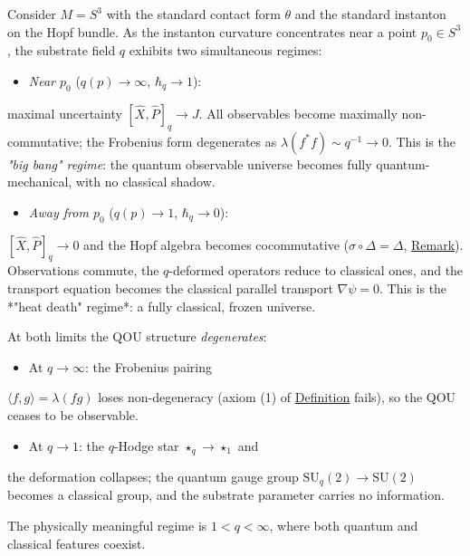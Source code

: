 \begin{example}
  \label{ex:cosmological-limits}
Consider $M = S^3$ with the standard contact form $\theta$ and the
standard instanton on the Hopf bundle.  As the instanton curvature
concentrates near a point $p_0 \in S^3$, the substrate field $q$
exhibits two simultaneous regimes:

\begin{itemize}
  \item \emph{Near $p_0$} ($q(p) \to \infty$, $\hbar_q \to 1$):
\end{itemize}
  maximal uncertainty $[\hat{X},\hat{P}]_q \to J$.
  All observables become maximally non-commutative; the
  Frobenius form degenerates as
  $\lambda(f^* f) \sim q^{-1} \to 0$.
  This is the \emph{"big bang" regime}: the quantum observable
  universe becomes fully quantum-mechanical, with no classical
  shadow.

\begin{itemize}
  \item \emph{Away from $p_0$} ($q(p) \to 1$, $\hbar_q \to 0$):
\end{itemize}
  $[\hat{X}, \hat{P}]_q \to 0$ and the Hopf algebra becomes
  cocommutative ($\sigma \circ \Delta = \Delta$,
  \hyperref[rem:hopf-non-cocommutativity]{Remark}).  Observations
  commute, the $q$-deformed operators reduce to classical ones,
  and the transport equation becomes the classical parallel
  transport $\nabla\psi = 0$.  This is the *"heat death"
  regime*: a fully classical, frozen universe.

At both limits the QOU structure \emph{degenerates}:

\begin{itemize}
  \item At $q \to \infty$: the Frobenius pairing
\end{itemize}
  $\langle f, g \rangle = \lambda(fg)$ loses non-degeneracy
  (axiom (1) of \hyperref[def:quantum-observable-universe]{Definition}
  fails), so the QOU ceases to be observable.

\begin{itemize}
  \item At $q \to 1$: the $q$-Hodge star $\star_q \to \star_1$ and
\end{itemize}
  the deformation collapses; the quantum gauge group
  $\mathrm{SU}_q(2) \to \mathrm{SU}(2)$ becomes a classical
  group, and the substrate parameter carries no information.

The physically meaningful regime is $1 < q < \infty$, where
both quantum and classical features coexist.
\end{example}


